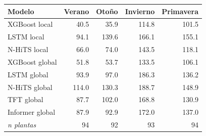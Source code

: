 \begin{tabular}{lrrrr}
\toprule
Modelo & Verano & Otoño & Invierno & Primavera \\
\midrule
XGBoost local & 40.5 & 35.9 & 114.8 & 101.5 \\
LSTM local & 94.1 & 139.6 & 166.1 & 155.1 \\
N-HiTS local & 66.0 & 74.0 & 143.5 & 118.1 \\
XGBoost global & 51.8 & 53.7 & 133.5 & 106.1 \\
LSTM global & 93.9 & 97.0 & 186.3 & 136.2 \\
N-HiTS global & 114.0 & 130.3 & 188.7 & 148.9 \\
TFT global & 87.7 & 102.0 & 168.8 & 130.9 \\
Informer global & 87.9 & 92.9 & 172.0 & 137.0 \\
\midrule
\textit{n plantas} & 94 & 92 & 93 & 94 \\
\bottomrule
\end{tabular}